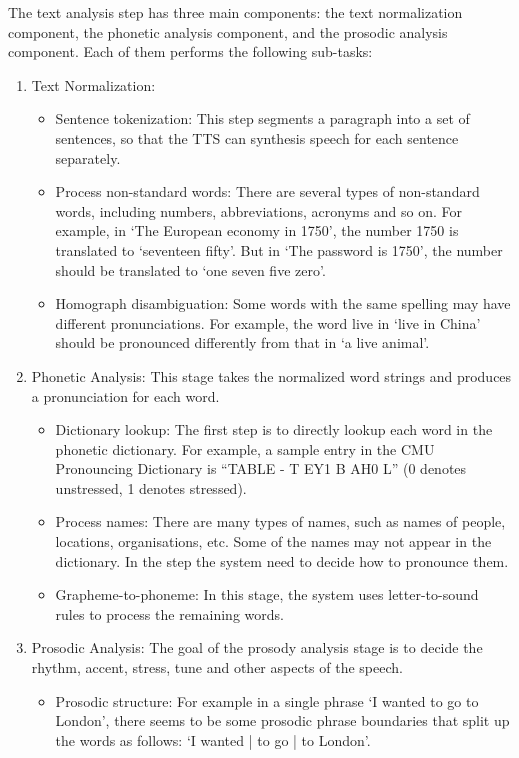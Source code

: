 \documentclass[paper=a4, fontsize=18pt]{article} %
\numberwithin{equation}{section} %
\numberwithin{figure}{section} %
\numberwithin{table}{section} %
\begin{document}
The text analysis step has three main components: the text normalization component, the phonetic analysis component, and the prosodic analysis component. Each of them performs the following sub-tasks:
\begin{enumerate}
\item{Text Normalization:
    \begin{itemize}
    \item Sentence tokenization: This step segments a paragraph into a set of sentences, so that the TTS can synthesis speech for each sentence separately.
    \item Process non-standard words: There are several types of non-standard words, including numbers, abbreviations, acronyms and so on. For example, in `The European economy in 1750', the number 1750 is translated to `seventeen fifty'. But in `The password is 1750', the number should be translated to `one seven five zero'.
    \item Homograph disambiguation: Some words with the same spelling may have different pronunciations. For example, the word live in `live in China' should be pronounced differently from that in `a live animal'.
    \end{itemize}
}
\item{Phonetic Analysis: This stage takes the normalized word strings and produces a pronunciation for each word.
    \begin{itemize}
    \item Dictionary lookup: The first step is to directly lookup each word in the phonetic dictionary. For example, a sample entry in the CMU Pronouncing Dictionary is ``TABLE - T EY1 B AH0 L'' (0 denotes unstressed, 1 denotes stressed).
    \item Process names: There are many types of names, such as names of people, locations, organisations, etc. Some of the names may not appear in the dictionary. In the step the system need to decide how to pronounce them.
    \item Grapheme-to-phoneme: In this stage, the system uses letter-to-sound rules to process the remaining words.
    \end{itemize}
}
\item{Prosodic Analysis: The goal of the prosody analysis stage is to decide the rhythm, accent, stress, tune and other aspects of the speech.
    \begin{itemize}
    \item Prosodic structure: For example in a single phrase `I wanted to go to London', there seems to be some prosodic phrase boundaries that split up the words as follows: `I wanted | to go | to London'.

\end{itemize}}
\end{enumerate}
\end{document}
